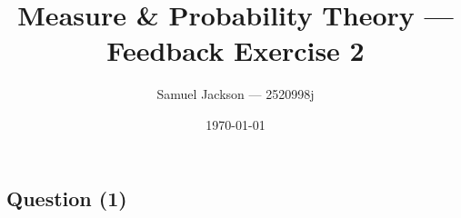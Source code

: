 \documentclass{article}
\title{Measure \& Probability Theory  --- Feedback Exercise 2}
\author{Samuel Jackson --- 2520998j}
\date{\today}
\begin{document}
\maketitle

\newcommand{\N}{\mathbb{N}}
\newcommand{\R}{\mathbb{R}}
\newcommand{\Z}{\mathbb{Z}}

\newcommand{\halfopen}[2]{\, [\frac{#1}{100},\frac{#2}{100}) \,}
\newcommand{\borel}{\mathcal{B}(\mathbb{R})}
\newcommand{\powerX}{\mathcal{P}(X)}
\newcommand{\infcup}{\bigcup_{j=0}^\infty}
\newcommand{\infsum}{\sum_{j=0}^\infty}

\newcommand{\outerset}{\mathcal{M}_{\outermu}}
\newcommand{\outermu}{\mu^\ast}
\newcommand{\outerlamb}{\lambda^\ast}


\begin{center}
\section*{Question (1)}
\end{center}
\end{document}
